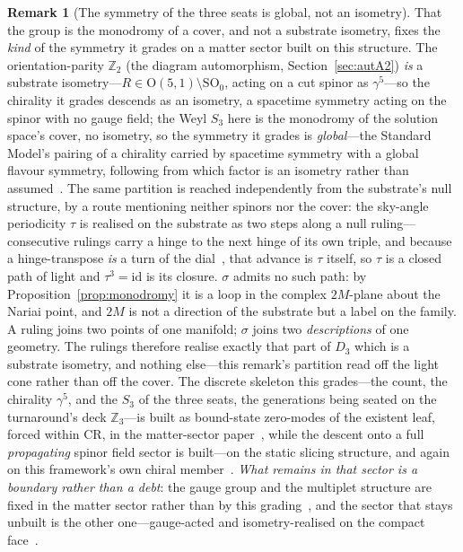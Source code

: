 \documentclass[11pt,a4paper]{article}
\theoremstyle{definition}
\newtheorem{remark}[theorem]{Remark}
\begin{document}
\begin{remark}[The symmetry of the three seats is global, not an isometry]
That the group is the monodromy of a cover, and not a substrate isometry, fixes the \emph{kind} of the symmetry it grades on a matter sector built on this structure. The orientation-parity $\mathbb{Z}_2$ (the diagram automorphism, Section~\ref{sec:autA2}) \emph{is} a substrate isometry---$R\in\mathrm{O}(5,1)\setminus\mathrm{SO}_0$, acting on a cut spinor as $\gamma^5$---so the chirality it grades descends as an isometry, a spacetime symmetry acting on the spinor with no gauge field; the Weyl $S_3$ here is the monodromy of the solution space's cover, no isometry, so the symmetry it grades is \emph{global}---the Standard Model's pairing of a chirality carried by spacetime symmetry with a global flavour symmetry, following from which factor is an isometry rather than assumed~\cite{JanzenAlgebroid,JanzenBoundary,JanzenGeometricCore}. The same partition is reached independently from the substrate's null structure, by a route mentioning neither spinors nor the cover: the sky-angle periodicity $\tau$ is realised on the substrate as two steps along a null ruling---consecutive rulings carry a hinge to the next hinge of its own triple, and because a hinge-transpose \emph{is} a turn of the dial~\cite{JanzenSlicing}, that advance is $\tau$ itself, so $\tau$ is a closed path of light and $\tau^{3}=\mathrm{id}$ is its closure. $\sigma$ admits no such path: by Proposition~\ref{prop:monodromy} it is a loop in the complex $2M$-plane about the Nariai point, and $2M$ is not a direction of the substrate but a label on the family. A ruling joins two points of one manifold; $\sigma$ joins two \emph{descriptions} of one geometry. The rulings therefore realise exactly that part of $D_{3}$ which is a substrate isometry, and nothing else---this remark's partition read off the light cone rather than off the cover. The discrete skeleton this grades---the count, the chirality $\gamma^5$, and the $S_3$ of the three seats, the generations being seated on the turnaround's deck $\mathbb{Z}_3$---is built as bound-state zero-modes of the existent leaf, forced within CR, in the matter-sector paper~\cite{JanzenMatter}, while the descent onto a full \emph{propagating} spinor field sector is built---on the static slicing structure, and again on this framework's own chiral member~\cite{JanzenCRframework,JanzenDynamics}. \emph{What remains in that sector is a boundary rather than a debt}: the gauge group and the multiplet structure are fixed in the matter sector rather than by this grading~\cite{JanzenMatter}, and the sector that stays unbuilt is the other one---gauge-acted and isometry-realised on the compact face~\cite{JanzenBoundary}.
\end{remark}
\end{document}
